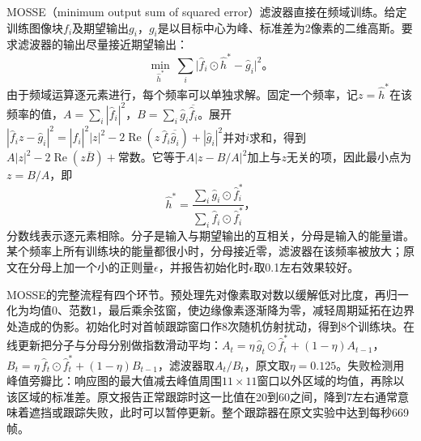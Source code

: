 MOSSE（minimum output sum of squared error）滤波器直接在频域训练。给定训练图像块$f_i$及期望输出$g_i$，$g_i$是以目标中心为峰、标准差为2像素的二维高斯。要求滤波器的输出尽量接近期望输出：
\begin{equation}
  \min_{\widehat{h}^*}\ \sum_i\bigl|\widehat{f}_i\odot\widehat{h}^*-\widehat{g}_i\bigr|^2\text{。}
  \label{eq:vision-video-mosse-objective}
\end{equation}
由于频域运算逐元素进行，每个频率可以单独求解。固定一个频率，记$z=\widehat{h}^*$在该频率的值，$A=\sum_i|\widehat{f}_i|^2$，$B=\sum_i\widehat{g}_i\overline{\widehat{f}_i}$。展开$|\widehat{f}_iz-\widehat{g}_i|^2=|\widehat{f}_i|^2|z|^2-2\operatorname{Re}(z\,\widehat{f}_i\overline{\widehat{g}_i})+|\widehat{g}_i|^2$并对$i$求和，得到$A|z|^2-2\operatorname{Re}(z\overline{B})+\text{常数}$。它等于$A|z-B/A|^2$加上与$z$无关的项，因此最小点为$z=B/A$，即
\begin{equation}
  \widehat{h}^*=\frac{\sum_i\widehat{g}_i\odot\widehat{f}_i^*}{\sum_i\widehat{f}_i\odot\widehat{f}_i^*}\text{，}
  \label{eq:vision-video-mosse}
\end{equation}
分数线表示逐元素相除。分子是输入与期望输出的互相关，分母是输入的能量谱。某个频率上所有训练块的能量都很小时，分母接近零，滤波器在该频率被放大；原文在分母上加一个小的正则量$\epsilon$，并报告初始化时$\epsilon$取0.1左右效果较好。

MOSSE的完整流程有四个环节。预处理先对像素取对数以缓解低对比度，再归一化为均值0、范数1，最后乘余弦窗，使边缘像素逐渐降为零，减轻周期延拓在边界处造成的伪影。初始化时对首帧跟踪窗口作8次随机仿射扰动，得到8个训练块。在线更新把分子与分母分别做指数滑动平均：$A_t=\eta\,\widehat{g}_t\odot\widehat{f}_t^*+(1-\eta)A_{t-1}$，$B_t=\eta\,\widehat{f}_t\odot\widehat{f}_t^*+(1-\eta)B_{t-1}$，滤波器取$A_t/B_t$，原文取$\eta=0.125$。失败检测用峰值旁瓣比：响应图的最大值减去峰值周围$11\times11$窗口以外区域的均值，再除以该区域的标准差。原文报告正常跟踪时这一比值在20到60之间，降到7左右通常意味着遮挡或跟踪失败，此时可以暂停更新。整个跟踪器在原文实验中达到每秒669帧。

